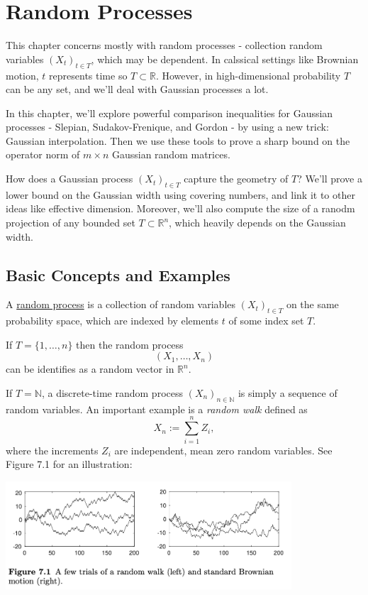 \section{Random Processes}
This chapter concerns mostly with random processes - collection random variables $(X_t)_{t \in T}$, which 
may be dependent. In calssical settings like Brownian motion, $t$ represents time so $T \subset \mathbb{R}$. 
However, in high-dimensional probability $T$ can be any set, and we'll deal with Gaussian processes a lot.

In this chapter, we'll explore powerful comparison inequalities for Gaussian processes - Slepian, 
Sudakov-Frenique, and Gordon - by using a new trick: Gaussian interpolation. Then we use these tools to prove 
a sharp bound on the operator norm of $m \times n$ Gaussian random matrices.

How does a Gaussian process $(X_t)_{t \in T}$ capture the geometry of $T$? We'll prove a lower bound on the 
Gaussian width using covering numbers, and link it to other ideas like effective dimension. Moreover, we'll 
also compute the size of a ranodm projection of any bounded set $T \subset \mathbb{R}^n$, which heavily depends 
on the Gaussian width.



\subsection{Basic Concepts and Examples}
\begin{definition}[]
\label{def:7.1.1}
A \underline{random process} is a collection of random variables $(X_t)_{t \in T}$ on the same probability 
space, which are indexed by elements $t$ of some index set $T$.
\end{definition}

\begin{example}
\label{ex:7.1.2}
If $T = \{1, \dots, n\}$ then the random process 
\[ (X_1, \dots, X_n) \]
can be identifies as a random vector in $\mathbb{R}^n$.
\end{example}

\begin{example}
\label{ex:7.1.3}
If $T = \mathbb{N}$, a discrete-time random process $(X_n)_{n \in \mathbb{N}}$ is simply a sequence of random 
variables. An important example is a \textit{random walk} defined as 
\[ X_n := \sum_{i = 1}^{n} Z_i, \]
where the increments $Z_i$ are independent, mean zero random variables. See Figure 7.1 for an illustration:
\begin{center}
	\includegraphics[width=0.8\textwidth]{Chapter 7/fig7-1.png}
\end{center}
\end{example}

